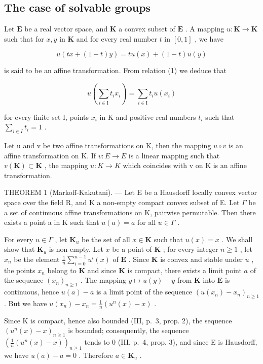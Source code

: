 \subsection{The case of solvable groups}

Let \(\mathbf{E}\) be a real vector space, and \(\mathbf{K}\) a convex subset of \(\mathbf{E}\) . A mapping \(u: \mathbf{K} \to \mathbf{K}\) such that for \(x, y\) in \(\mathbf{K}\) and for every real number \(t\) in \([0, 1]\) , we have

\[
u (t x + (1 - t) y) = t u (x) + (1 - t) u (y)\tag{1}
\]

is said to be an affine transformation. From relation (1) we deduce that

\[
u \left(\sum_ {i \in \mathrm{I}} t _ {i} x _ {i}\right) = \sum_ {i \in \mathrm{I}} t _ {i} u \left(x _ {i}\right)\tag{2}
\]

for every finite set I, points \(x_{i}\) in K and positive real numbers \(t_i\) such that \(\sum_{i\in I}t_i = 1\) .

Let u and v be two affine transformations on K, then the mapping \(u \circ v\) is an affine transformation on K. If \(v: E \to E\) is a linear mapping such that \(v(\mathbf{K}) \subset \mathbf{K}\) , the mapping \(u: K \to K\) which coincides with v on K is an affine transformation.

THEOREM 1 (Markoff-Kakutani). --- Let E be a Hausdorff locally convex vector space over the field R, and K a non-empty compact convex subset of E. Let \(\Gamma\) be a set of continuous affine transformations on K, pairwise permutable. Then there exists a point a in K such that \(u(a) = a\) for all \(u \in \Gamma\) .

For every \(u \in \Gamma\) , let \(\mathbf{K}_u\) be the set of all \(x \in \mathbf{K}\) such that \(u(x) = x\) . We shall show that \(\mathbf{K}_u\) is non-empty. Let \(x\) be a point of \(\mathbf{K}\) ; for every integer \(n \geqslant 1\) , let \(x_n\) be the element \(\frac{1}{n} \sum_{i=0}^{n-1} u^i(x)\) of \(\mathbf{E}\) . Since \(\mathbf{K}\) is convex and stable under \(u\) , the points \(x_n\) belong to \(\mathbf{K}\) and since \(\mathbf{K}\) is compact, there exists a limit point \(a\) of the sequence \((x_n)_{n \geqslant 1}\) . The mapping \(y \mapsto u(y) - y\) from \(\mathbf{K}\) into \(\mathbf{E}\) is continuous, hence \(u(a) - a\) is a limit point of the sequence \((u(x_n) - x_n)_{n \geqslant 1}\) . But we have \(u(x_n) - x_n = \frac{1}{n} (u^n(x) - x)\) .

Since K is compact, hence also bounded (III, p.~3, prop. 2), the sequence \((u^n(x) - x)_{n\geqslant 1}\) is bounded; consequently, the sequence \(\left(\frac{1}{n} (u^n (x) - x)\right)_{n\geqslant 1}\) tends to 0 (III, p.~4, prop. 3), and since E is Hausdorff, we have \(u(a) - a = 0\) . Therefore \(a\in \mathbf{K}_u\) .

